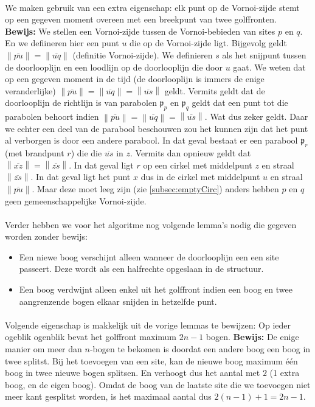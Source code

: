 \documentclass[a4paper,titlepage]{article}
\newcommand{\norm}[1]{\left\|#1\right\|}
\newcommand{\linep}[1]{\overline{#1}}
\newcommand{\brak}[1]{\left(#1\right)}
\begin{document}
\paragraph{}We maken gebruik van een extra eigenschap: elk punt op de Vornoi-zijde stemt op een gegeven moment overeen met een breekpunt van twee golffronten.\\
\textbf{Bewijs: }We stellen een Vornoi-zijde tussen de Vornoi-bebieden van sites $p$ en $q$. En we defiineren hier een punt $u$ die op de Vornoi-zijde ligt. Bijgevolg geldt $\norm{\linep{pu}}=\norm{\linep{uq}}$ (definitie Vornoi-zijde). We definieren $s$ als het snijpunt tussen de doorlooplijn en een loodlijn op de doorlooplijn die door $u$ gaat. We weten dat op een gegeven moment in de tijd (de doorlooplijn is immers de enige veranderlijke) $\norm{\linep{pu}}=\norm{\linep{uq}}=\norm{\linep{us}}$ geldt. Vermits geldt dat de doorlooplijn de richtlijn is van parabolen $\mathfrak{p}_p$ en $\mathfrak{p}_q$ geldt dat een punt tot die parabolen behoort indien $\norm{\linep{pu}}=\norm{\linep{uq}}=\norm{\linep{us}}$. Wat dus zeker geldt. Daar we echter een deel van de parabool beschouwen zou het kunnen zijn dat het punt al verborgen is door een andere parabool. In dat geval bestaat er een parabool $\mathfrak{p}_r$ (met brandpunt $r$) die die $\linep{us}$ in $z$. Vermits dan opnieuw geldt dat $\norm{\linep{xz}}=\norm{\linep{zs}}$. In dat geval ligt $r$ op een cirkel met middelpunt $z$ en straal $\norm{\linep{zs}}$. In dat geval ligt het punt $x$ dus in de cirkel met middelpunt $u$ en straal $\norm{\linep{pu}}$. Maar deze moet leeg zijn (zie \ref{subsec:emptyCirc}) anders hebben $p$ en $q$ geen gemeenschappelijke Vornoi-zijde.
\paragraph{}Verder hebben we voor het algoritme nog volgende lemma's nodig die gegeven worden zonder bewijs:
\begin{itemize}
 \item Een niewe boog verschijnt alleen wanneer de doorlooplijn een een site passeert. Deze wordt als een halfrechte opgeslaan in de structuur.
 \item Een boog verdwijnt alleen enkel uit het golffront indien een boog en twee aangrenzende bogen elkaar snijden in hetzelfde punt.
\end{itemize}
\paragraph{}Volgende eigenschap is makkelijk uit de vorige lemmas te bewijzen: Op ieder ogeblik ogenblik bevat het golffront maximum $2n-1$ bogen.
\textbf{Bewijs: } De enige manier om meer dan $n$-bogen te bekomen is doordat een andere boog een boog in twee splitst. Bij het toevoegen van een site, kan de nieuwe boog maximum \'e\'en boog in twee nieuwe bogen splitsen. En verhoogt dus het aantal met $2$ (1 extra boog, en de eigen boog). Omdat de boog van de laatste site die we toevoegen niet meer kant gesplitst worden, is het maximaal aantal dus $2\brak{n-1}+1=2n-1$.
\end{document}
